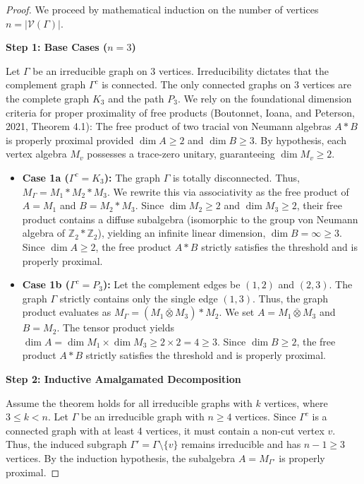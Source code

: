 \documentclass[12pt]{article}
\newcommand{\VV}{\mathcal{V}}
\begin{document}
\begin{proof}
We proceed by mathematical induction on the number of vertices $n = |\VV(\Gamma)|$. 

\medskip\noindent\textbf{Step 1: Base Cases ($n=3$)}

Let $\Gamma$ be an irreducible graph on 3 vertices. Irreducibility dictates that the complement graph $\Gamma^c$ is connected. The only connected graphs on 3 vertices are the complete graph $K_3$ and the path $P_3$. 
We rely on the foundational dimension criteria for proper proximality of free products (Boutonnet, Ioana, and Peterson, 2021, Theorem 4.1): The free product of two tracial von Neumann algebras $A \ast B$ is properly proximal provided $\dim A \ge 2$ and $\dim B \ge 3$. By hypothesis, each vertex algebra $M_v$ possesses a trace-zero unitary, guaranteeing $\dim M_v \ge 2$.
\begin{itemize}
    \item \textbf{Case 1a ($\Gamma^c = K_3$):} The graph $\Gamma$ is totally disconnected. Thus, $M_\Gamma = M_1 \ast M_2 \ast M_3$. We rewrite this via associativity as the free product of $A = M_1$ and $B = M_2 \ast M_3$. Since $\dim M_2 \ge 2$ and $\dim M_3 \ge 2$, their free product contains a diffuse subalgebra (isomorphic to the group von Neumann algebra of $\mathbb{Z}_2 \ast \mathbb{Z}_2$), yielding an infinite linear dimension, $\dim B = \infty \ge 3$. Since $\dim A \ge 2$, the free product $A \ast B$ strictly satisfies the threshold and is properly proximal.
    
    \item \textbf{Case 1b ($\Gamma^c = P_3$):} Let the complement edges be $(1,2)$ and $(2,3)$. The graph $\Gamma$ strictly contains only the single edge $(1,3)$. Thus, the graph product evaluates as $M_\Gamma = (M_1 \overline{\otimes} M_3) \ast M_2$. We set $A = M_1 \overline{\otimes} M_3$ and $B = M_2$. The tensor product yields $\dim A = \dim M_1 \times \dim M_3 \ge 2 \times 2 = 4 \ge 3$. Since $\dim B \ge 2$, the free product $A \ast B$ strictly satisfies the threshold and is properly proximal.
\end{itemize}

\medskip\noindent\textbf{Step 2: Inductive Amalgamated Decomposition}

Assume the theorem holds for all irreducible graphs with $k$ vertices, where $3 \le k < n$. Let $\Gamma$ be an irreducible graph with $n \ge 4$ vertices. Since $\Gamma^c$ is a connected graph with at least 4 vertices, it must contain a non-cut vertex $v$. Thus, the induced subgraph $\Gamma' = \Gamma \setminus \{v\}$ remains irreducible and has $n-1 \ge 3$ vertices. By the induction hypothesis, the subalgebra $A = M_{\Gamma'}$ is properly proximal.


\end{proof}
\end{document}
